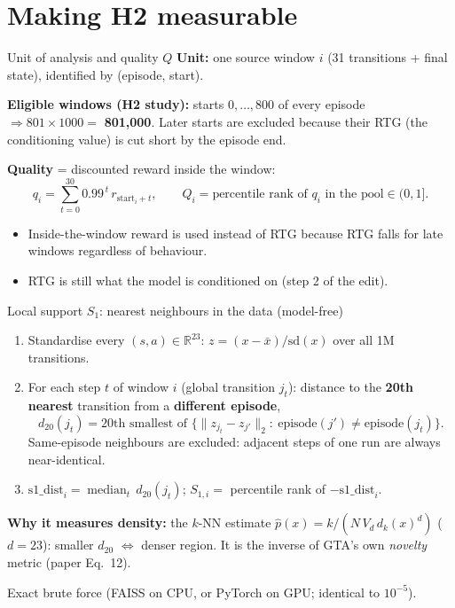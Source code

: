 \documentclass[aspectratio=169,11pt]{beamer}
\begin{document}
\section{Making H2 measurable}
\begin{frame}{Unit of analysis and quality $Q$}
\textbf{Unit:} one source window $i$ (31 transitions + final state), identified by (episode, start).
\vspace{0.4em}

\textbf{Eligible windows (H2 study):} starts $0,\dots,800$ of every episode $\Rightarrow 801\times1000=$ \textbf{801{,}000}.
Later starts are excluded because their RTG (the conditioning value) is cut short by the episode end.
\vspace{0.6em}

\textbf{Quality} = discounted reward inside the window:
\[
q_i=\sum_{t=0}^{30}0.99^{\,t}\,r_{\text{start}_i+t},\qquad Q_i=\text{percentile rank of }q_i\text{ in the pool}\in(0,1].
\]
\begin{itemize}
\item Inside-the-window reward is used instead of RTG because RTG falls for late windows regardless of behaviour.
\item RTG is still what the model is conditioned on (step 2 of the edit).
\end{itemize}
\end{frame}

\begin{frame}{Local support $S_1$: nearest neighbours in the data (model-free)}
\begin{enumerate}
\item Standardise every $(s,a)\in\mathbb R^{23}$: $z=(x-\bar x)/\mathrm{sd}(x)$ over all 1M transitions.
\item For each step $t$ of window $i$ (global transition $j_t$): distance to the \textbf{20th nearest} transition from a \textbf{different episode},
\[
d_{20}(j_t)=\text{20th smallest of }\{\lVert z_{j_t}-z_{j'}\rVert_2:\ \text{episode}(j')\neq\text{episode}(j_t)\}.
\]
Same-episode neighbours are excluded: adjacent steps of one run are always near-identical.
\item $\text{s1\_dist}_i=\operatorname{median}_t\,d_{20}(j_t)$; \quad $S_{1,i}=$ percentile rank of $-\text{s1\_dist}_i$.
\end{enumerate}
\vspace{0.4em}
\textbf{Why it measures density:} the $k$-NN estimate $\hat p(x)=k/(N\,V_d\,d_k(x)^d)$ ($d=23$): smaller $d_{20}$ $\Leftrightarrow$ denser region.
It is the inverse of GTA's own \emph{novelty} metric (paper Eq.~12).
\vspace{0.3em}

\small Exact brute force (FAISS on CPU, or PyTorch on GPU; identical to $10^{-5}$).
\end{frame}
\end{document}
